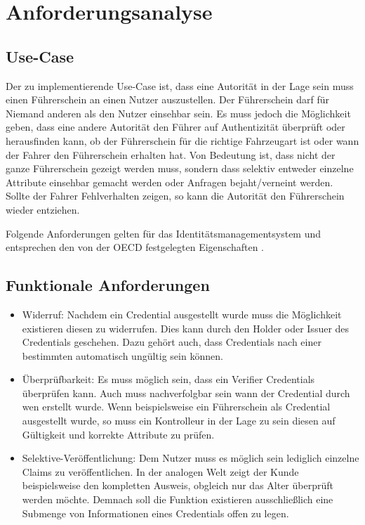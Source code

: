 \chapter{Anforderungsanalyse}

\section{Use-Case}
Der zu implementierende Use-Case ist, dass eine Autorität in der Lage sein muss einen Führerschein an einen Nutzer auszustellen. Der Führerschein darf für Niemand anderen als den Nutzer einsehbar sein. Es muss jedoch die Möglichkeit geben, dass eine andere Autorität den Führer auf Authentizität überprüft oder herausfinden kann, ob der Führerschein für die richtige Fahrzeugart ist oder wann der Fahrer den Führerschein erhalten hat. Von Bedeutung ist, dass nicht der ganze Führerschein gezeigt werden muss, sondern dass selektiv entweder einzelne Attribute einsehbar gemacht werden oder Anfragen bejaht/verneint werden. Sollte der Fahrer Fehlverhalten zeigen, so kann die Autorität den Führerschein wieder entziehen.

\label{cha:anforderungsanalyse}
Folgende Anforderungen gelten für das Identitätsmanagementsystem und entsprechen den von der OECD festgelegten Eigenschaften \cite{ID25} \cite{ID26}.
\section{Funktionale Anforderungen}
\begin{itemize}
	\item Widerruf: Nachdem ein Credential ausgestellt wurde muss die Möglichkeit existieren diesen zu widerrufen. Dies kann durch den Holder oder Issuer des Credentials geschehen. Dazu gehört auch, dass Credentials nach einer bestimmten automatisch ungültig sein können.
	\item Überprüfbarkeit: Es muss möglich sein, dass ein Verifier Credentials überprüfen kann. Auch muss nachverfolgbar sein wann der Credential durch wen erstellt wurde. Wenn beispielsweise ein Führerschein als Credential ausgestellt wurde, so muss ein Kontrolleur in der Lage zu sein diesen auf Gültigkeit und korrekte Attribute zu prüfen.
	\item Selektive-Veröffentlichung: Dem Nutzer muss es möglich sein lediglich einzelne Claims zu veröffentlichen. In der analogen Welt zeigt der Kunde beispielsweise den kompletten Ausweis, obgleich nur das Alter überprüft werden möchte. Demnach soll die Funktion existieren ausschließlich eine Submenge von Informationen eines Credentials offen zu legen.
\end{itemize}

